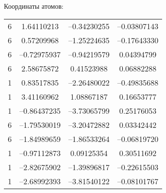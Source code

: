 {Координаты атомов:
\begin{center}
\begin{tabular}{cccc}
   6  &   1.64110213 & --0.34230255 & --0.03807143\\
   6  &   0.57209968 & --1.25224635 & --0.17643330\\
   6  &  --0.72975937 & --0.94219579 &  0.04394799\\
   6  &   2.58675872 &  0.41523988 &  0.06882288\\
   1  &   0.83517835 & --2.26480022 & --0.49835688\\
   1  &   3.41160962 &  1.08867187 &  0.16653777\\
   1  &  --0.86437235 & --3.73065799 &  0.25176053\\
   6  &  --1.79530019 & --3.20472882 &  0.03342442\\
   6  &  --1.84989659 & --1.86533264 & --0.06819720\\
   1  &  --0.97112873 &  0.09125354 &  0.30511692\\
   1  &  --2.82675902 & --1.39896817 & --0.22615503\\
   1  &  --2.68992393 & --3.81540122 & --0.08101767\\
  \end{tabular}
\end{center}

}
